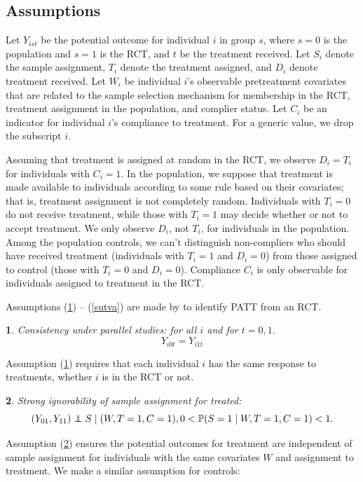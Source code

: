 \documentclass[12pt]{article}
\makeatletter
\newtheorem*{assumption*}{\assumptionnumber}
\providecommand{\assumptionnumber}{}
\newenvironment{assumption}[2]
 {%
  \renewcommand{\assumptionnumber}{Assumption #1}%
  \begin{assumption*}%
  \protected@edef\@currentlabel{#1}%
 }
 {%
  \end{assumption*}
 }
\newcommand{\pr}{\mathbb{P}} %
\newcommand\independent{\protect\mathpalette{\protect\independenT}{\perp}}
\def\independenT#1#2{\mathrel{\rlap{$#1#2$}\mkern2mu{#1#2}}}
\makeatother
\begin{document}
\subsection{Assumptions} 
Let $Y_{ist}$ be the potential outcome for individual $i$ in group $s$, where $s=0$ is the population and $s=1$ is the RCT, and $t$ be the treatment received.  Let $S_i$ denote the sample assignment, $T_i$ denote the treatment assigned, and $D_i$ denote treatment received. Let $W_i$ be individual $i$'s observable pretreatment covariates that are related to the sample selection mechanism for membership in the RCT, treatment assignment in the population, and complier status.  Let $C_i$ be an indicator for individual $i$'s compliance to treatment.  For a generic value, we drop the subscript $i$.  

Assuming that treatment is assigned at random in the RCT, we observe $D_i = T_i$ for individuals with $C_i = 1$.  In the population, we suppose that treatment is made available to individuals according to some rule based on their covariates; that is, treatment assignment is not completely random. Individuals with $T_i = 0$ do not receive treatment, while those with $T_i=1$ may decide whether or not to accept treatment.  We only observe $D_i$, not $T_i$, for individuals in the population.  Among the population controls, we can't distinguish non-compliers who should have received treatment (individuals with $T_i=1$ and $D_i = 0$) from those assigned to control (those with $T_i = 0$ and $D_i = 0$).  Compliance $C_i$ is only observable for individuals assigned to treatment in the RCT. 

Assumptions (\ref{consistency}) -- (\ref{sutva}) are made by \cite{Hartman} to identify PATT from an RCT. 

\begin{assumption}{1}{}\label{consistency}
Consistency under parallel studies: for all $i$ and for $t=0, 1$.
$$Y_{i0t} = Y_{i1t}$$
\end{assumption}

\noindent Assumption (\ref{consistency}) requires that each individual $i$ has the same response to treatments, whether $i$ is in the RCT or not. 

\begin{assumption}{2}{}\label{si_treat}
Strong ignorability of sample assignment for treated:
\begin{equation*}
(Y_{01}, Y_{11}) \independent S \mid (W, T=1,C = 1), 0 < \pr(S=1 \mid W, T=1,C = 1) <1.
\end{equation*}
\end{assumption}
\noindent Assumption (\ref{si_treat}) ensures the potential outcomes for treatment are independent of sample assignment for individuals with the same covariates $W$ and assignment to treatment. We make a similar assumption for controls: 
\end{document}
